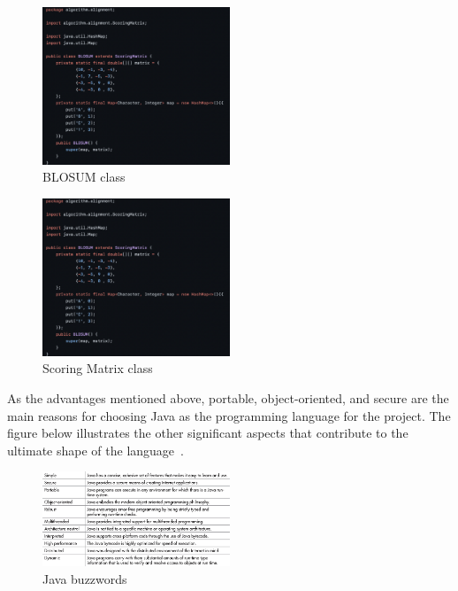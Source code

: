 \documentclass[]{final_report}
\begin{document}
\begin{figure}[H]
    \centering
    \includegraphics[width=0.5\textwidth]{BLOSUM.png}
    \caption{BLOSUM class}
    \label{fig:BLOSUM_C}
\end{figure}

\begin{figure}[H]
    \centering
    \includegraphics[width=0.5\textwidth]{Scoring Matrix.png}
    \caption{Scoring Matrix class}
    \label{fig:Scoring_Matrix_C}
\end{figure}
As the advantages mentioned above, portable, object-oriented, and secure are the main reasons for choosing Java as the programming language for the project.
The figure below illustrates the other significant aspects that contribute to the ultimate shape of the language~\cite{schildt2019java}.


\begin{figure}[H]
    \centering
    \includegraphics[width=0.5\textwidth]{why java.jpeg}
    \caption{Java buzzwords\cite{schildt2019java}}
    \label{fig:java_buzzwords}
\end{figure}
\end{document}
